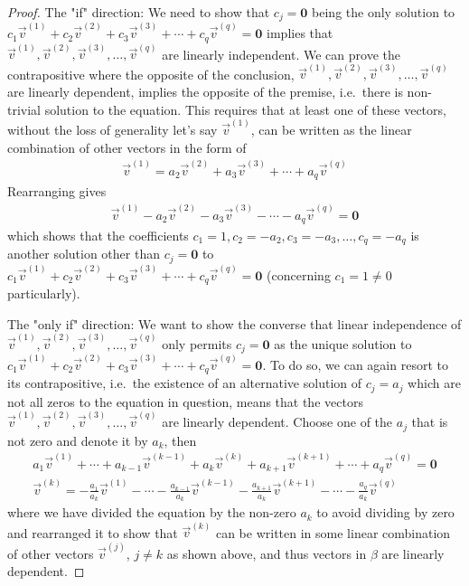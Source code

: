 \begin{proof}
The "if" direction: We need to show that $c_j = \textbf{0}$ being the only solution to $c_1\vec{v}^{(1)} + c_2\vec{v}^{(2)} + c_3\vec{v}^{(3)} + \cdots + c_q\vec{v}^{(q)} = \textbf{0}$ implies that $\vec{v}^{(1)}, \vec{v}^{(2)}, \vec{v}^{(3)}, \ldots, \vec{v}^{(q)}$ are linearly independent. We can prove the contrapositive where the opposite of the conclusion, $\vec{v}^{(1)}, \vec{v}^{(2)}, \vec{v}^{(3)}, \ldots, \vec{v}^{(q)}$ are linearly dependent, implies the opposite of the premise, i.e.\ there is non-trivial solution to the equation. This requires that at least one of these vectors, without the loss of generality let's say $\vec{v}^{(1)}$, can be written as the linear combination of other vectors in the form of
\begin{align*}
\vec{v}^{(1)} = a_2\vec{v}^{(2)} + a_3\vec{v}^{(3)} + \cdots + a_q\vec{v}^{(q)}
\end{align*}
Rearranging gives 
\begin{align*}
\vec{v}^{(1)} - a_2\vec{v}^{(2)} - a_3\vec{v}^{(3)} - \cdots - a_q\vec{v}^{(q)} = \textbf{0}
\end{align*}
which shows that the coefficients $c_1 = 1, c_2 = -a_2, c_3 = -a_3, \ldots, c_q = -a_q$ is another solution other than $c_j = \textbf{0}$ to $c_1\vec{v}^{(1)} + c_2\vec{v}^{(2)} + c_3\vec{v}^{(3)} + \cdots + c_q\vec{v}^{(q)} = \textbf{0}$ (concerning $c_1 = 1 \neq 0$ particularly). \par
The "only if" direction: We want to show the converse that linear independence of $\vec{v}^{(1)}, \vec{v}^{(2)}, \vec{v}^{(3)}, \ldots, \vec{v}^{(q)}$ only permits $c_j = \textbf{0}$ as the unique solution to $c_1\vec{v}^{(1)} + c_2\vec{v}^{(2)} + c_3\vec{v}^{(3)} + \cdots + c_q\vec{v}^{(q)} = \textbf{0}$. To do so, we can again resort to its contrapositive, i.e.\ the existence of an alternative solution of $c_j = a_j$ which are not all zeros to the equation in question, means that the vectors $\vec{v}^{(1)}, \vec{v}^{(2)}, \vec{v}^{(3)}, \ldots, \vec{v}^{(q)}$ are linearly dependent. Choose one of the $a_j$ that is not zero and denote it by $a_k$, then
\begin{align*}
a_1\vec{v}^{(1)} + \cdots + a_{k-1}\vec{v}^{(k-1)} + a_k\vec{v}^{(k)} + a_{k+1}\vec{v}^{(k+1)} + \cdots + a_q\vec{v}^{(q)} = \textbf{0} \\
\vec{v}^{(k)} = -\frac{a_1}{a_k}\vec{v}^{(1)} - \cdots - \frac{a_{k-1}}{a_k}\vec{v}^{(k-1)} - \frac{a_{k+1}}{a_k}\vec{v}^{(k+1)} - \cdots - \frac{a_q}{a_k}\vec{v}^{(q)} 
\end{align*}
where we have divided the equation by the non-zero $a_k$ to avoid dividing by zero and rearranged it to show that $\vec{v}^{(k)}$ can be written in some linear combination of other vectors $\vec{v}^{(j)}$, $j \neq k$ as shown above, and thus vectors in $\mathcal{\beta}$ are linearly dependent. 
\end{proof}
